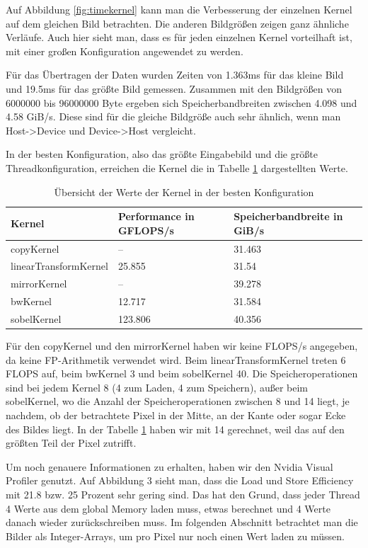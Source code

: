 \documentclass[12pt,a4paper]{scrartcl}
\begin{document}
Auf Abbildung \ref{fig:timekernel} kann man die Verbesserung der einzelnen Kernel auf dem gleichen Bild betrachten.
Die anderen Bildgr\"o\ss en zeigen ganz \"ahnliche Verl\"aufe.
Auch hier sieht man, dass es f\"ur jeden einzelnen Kernel vorteilhaft ist, mit einer gro\ss en Konfiguration angewendet zu werden.

F\"ur das \"Ubertragen der Daten wurden Zeiten von 1.363ms f\"ur das kleine Bild und 19.5ms f\"ur das gr\"o\ss te Bild gemessen.
Zusammen mit den Bildgr\"o\ss en von 6000000 bis 96000000 Byte ergeben sich Speicherbandbreiten zwischen 4.098 und 4.58 GiB/s.
Diese sind f\"ur die gleiche Bildgr\"o\ss e auch sehr \"ahnlich, wenn man Host->Device und Device->Host vergleicht.

In der besten Konfiguration, also das gr\"o\ss te Eingabebild und die gr\"o\ss te Threadkonfiguration, erreichen die Kernel die in Tabelle \ref{perf} dargestellten Werte.

\begin{table}[h]
    \centering
    \begin{tabular}{l|l|l}
    \hline
    Kernel & Performance in GFLOPS/s & Speicherbandbreite in GiB/s \\
    \hline
    copyKernel & --                  & 31.463 \\
    linearTransformKernel & 25.855   & 31.54 \\
    mirrorKernel & --                & 39.278 \\
    bwKernel & 12.717                & 31.584 \\
    sobelKernel & 123.806            & 40.356 \\
    \hline
    \end{tabular}
    \caption{\"Ubersicht der Werte der Kernel in der besten Konfiguration}
    \label{perf}
\end{table}

F\"ur den copyKernel und den mirrorKernel haben wir keine FLOPS/s angegeben, da keine FP-Arithmetik verwendet wird.
Beim linearTransformKernel treten 6 FLOPS auf, beim bwKernel 3 und beim sobelKernel 40.
Die Speicheroperationen sind bei jedem Kernel 8 (4 zum Laden, 4 zum Speichern), au\ss er beim sobelKernel, wo die Anzahl der Speicheroperationen zwischen 8 und 14 liegt, je nachdem, ob der betrachtete Pixel in der Mitte, an der Kante oder sogar Ecke des Bildes liegt.
In der Tabelle \ref{perf} haben wir mit 14 gerechnet, weil das auf den gr\"o\ss ten Teil der Pixel zutrifft.

Um noch genauere Informationen zu erhalten, haben wir den Nvidia Visual Profiler genutzt.
Auf Abbildung 3 sieht man, dass die Load und Store Efficiency mit 21.8 bzw. 25 Prozent sehr gering sind.
Das hat den Grund, dass jeder Thread 4 Werte aus dem global Memory laden muss, etwas berechnet und 4 Werte danach wieder zur\"uckschreiben muss.
Im folgenden Abschnitt betrachtet man die Bilder als Integer-Arrays, um pro Pixel nur noch einen Wert laden zu m\"ussen.
\end{document}
